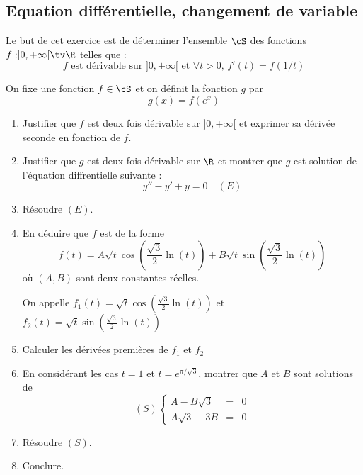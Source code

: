 \begin{correction}
\begin{enumerate}

\end{enumerate}
\end{correction}


\subsection{Equation différentielle, changement de variable}
\begin{exercice}
Le but de cet exercice est de déterminer l'ensemble $\cS$ des fonctions
$f :]0,+\infty[\tv \R$ telles que : 
$$ \text{$f$ est dérivable sur $]0,+\infty[$ et } \forall t>0, \, f'(t) = f(1/t)$$

On fixe une fonction $f\in \cS$ et on définit la fonction $g$ par 
$$g(x) =f(e^{x})$$
\begin{enumerate}
\item Justifier que $f$ est deux fois dérivable sur $]0,+\infty[$ et exprimer sa dérivée seconde en fonction de $f$. 
\item Justifier que $g$ est deux fois dérivable sur $\R$ et montrer que $g$ est solution de l'équation diffrentielle suivante : 
$$y''-y'+y=0\quad(E)$$
\item Résoudre $(E)$. 
\item En déduire que $f$ est de la forme $$f(t) = A \sqrt{t}  \cos\left(\frac{\sqrt{3}}{2}\ln(t)\right) +B\sqrt{t}  \sin\left(\frac{\sqrt{3}}{2}\ln(t)\right)$$ où $(A,B)$ sont deux constantes réelles.

On appelle $f_1(t) =  \sqrt{t}  \cos\left(\frac{\sqrt{3}}{2}\ln(t)\right)$ et 
$f_2(t)= \sqrt{t}  \sin\left(\frac{\sqrt{3}}{2}\ln(t)\right)$
\item Calculer les dérivées premières de $f_1$ et $f_2$
\item En considérant les cas $t=1$ et $t=e^{\pi/\sqrt{3}}$, montrer que $A$ et $B$ sont solutions de
$$(S) \left\{ \begin{array}{ccc}
A-B\sqrt{3}&=&0\\
A\sqrt{3}-3B&=&0
\end{array}\right.$$
\item Résoudre $(S)$. 
\item Conclure. 
\end{enumerate} 
\end{exercice}


